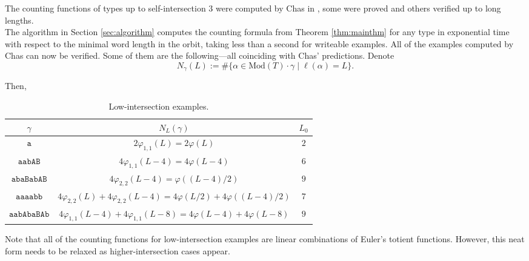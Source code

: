 \documentclass{article}
\newcommand{\Mod}{\mathrm{Mod}}
\begin{document}
	\begin{examples}
		The counting functions of types up to self-intersection $3$ were computed by Chas in \cite{Chas}, some were proved and others verified up to long lengths.\\
		
		The algorithm in Section \ref{sec:algorithm} computes the counting formula from Theorem \ref{thm:mainthm} for any type in exponential time with respect to the minimal word length in the orbit, taking less than a second for writeable examples. All of the examples computed by Chas can now be verified. Some of them are the following---all coinciding with Chas' predictions. Denote 
		\[
		N_\gamma(L):=\# \{ \alpha \in \Mod(T) \cdot \gamma \mid \ell(\alpha) = L \}.
		\]
		
		Then,
		
		 \begin{table}[ht]
        \centering
        \begin{tabular}[t]{c|c|c}
            \toprule
            $\gamma$ & $N_L(\gamma)$ & $L_0$ \\
            \midrule
            $\mathtt{a}$ & $2\varphi_{1,1}(L) = 2\varphi(L)$ & $2$ \\
            \midrule
            $\mathtt{aabAB}$ & $4\varphi_{1,1}(L-4) = 4\varphi(L-4)$ & $6$ \\
            \midrule
            $\mathtt{abaBabAB}$ & $4\varphi_{2,2}(L-4) = \varphi((L-4)/2)$ & $9$ \\
            \midrule
            $\mathtt{aaaabb}$ & $4\varphi_{2,2}(L) + 4\varphi_{2,2}(L-4) = 4\varphi(L/2) + 4\varphi((L-4)/2)$ & $7$ \\
            \midrule
            $\mathtt{aabAbaBAb}$ & $4\varphi_{1,1}(L-4) + 4\varphi_{1,1}(L-8) = 4\varphi(L-4) + 4\varphi(L-8)$ & $9$ \\
            \bottomrule
        \end{tabular}
        \caption{Low-intersection examples.}
        \label{tab:exampleslow}
    \end{table}
		Note that all of the counting functions for low-intersection examples are linear combinations of Euler's totient functions. However, this neat form needs to be relaxed as higher-intersection cases appear. \\
		

\end{examples}
\end{document}
